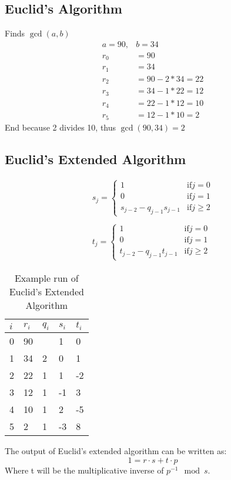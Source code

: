 
\subsection{Euclid's Algorithm}
\label{sec:euclids-algorithm}
Finds $\gcd(a, b)$
\begin{align*}
  a = 90,& b = 34 \\
  r_0 &= 90\\
  r_1 &= 34\\
  r_2 &= 90 - 2*34 = 22\\
  r_3 &= 34 - 1*22 = 12\\
  r_4 &= 22 - 1*12 = 10\\
  r_5 &= 12 - 1*10 = 2
\end{align*}
End because 2 divides 10, thus $\gcd(90, 34) = 2$

\subsection{Euclid's Extended Algorithm}
\label{sec:euclids-extended}
\begin{align*}
  s_j = \begin{cases}
    1 &\mbox{if} j = 0\\
    0 &\mbox{if} j = 1\\
    s_{j-2} - q_{j-1}s_{j-1} &\mbox{if} j \ge 2
  \end{cases}\\ \\
  t_j = \begin{cases}
    1 &\mbox{if} j = 0\\
    0 &\mbox{if} j = 1\\
    t_{j-2} - q_{j-1}t_{j-1} &\mbox{if} j \ge 2
  \end{cases}
\end{align*}

\begin{table}[H]
  \centering
  \begin{tabular}{lllll}
    $i$ & $r_i$ & $q_i$ & $s_i$ & $t_i$ \\ \hline
    0   & 90    &       & 1     & 0     \\
    1   & 34    & 2     & 0     & 1     \\
    2   & 22    & 1     & 1     & -2    \\
    3   & 12    & 1     & -1    & 3     \\
    4   & 10    & 1     & 2     & -5    \\
    5   & 2     & 1     & -3    & 8     \\
  \end{tabular}
  \caption{Example run of Euclid's Extended Algorithm}
\end{table}
The output of Euclid's extended algorithm can be written as:
\[ 1 = r \cdot s + t \cdot p\]
Where t will be the multiplicative inverse of $p^{-1} \mod s$. 
